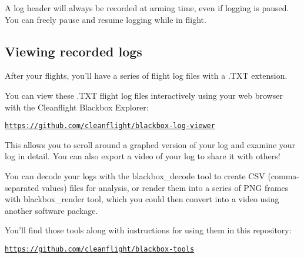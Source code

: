 A log header will always be recorded at arming time, even if logging is paused. You can freely pause and resume logging while in flight.

\subsection*{Viewing recorded logs}

After your flights, you'll have a series of flight log files with a .T\+X\+T extension.

You can view these .T\+X\+T flight log files interactively using your web browser with the Cleanflight Blackbox Explorer\+:

\href{https://github.com/cleanflight/blackbox-log-viewer}{\tt https\+://github.\+com/cleanflight/blackbox-\/log-\/viewer}

This allows you to scroll around a graphed version of your log and examine your log in detail. You can also export a video of your log to share it with others!

You can decode your logs with the {\ttfamily blackbox\+\_\+decode} tool to create C\+S\+V (comma-\/separated values) files for analysis, or render them into a series of P\+N\+G frames with {\ttfamily blackbox\+\_\+render} tool, which you could then convert into a video using another software package.

You'll find those tools along with instructions for using them in this repository\+:

\href{https://github.com/cleanflight/blackbox-tools}{\tt https\+://github.\+com/cleanflight/blackbox-\/tools} 